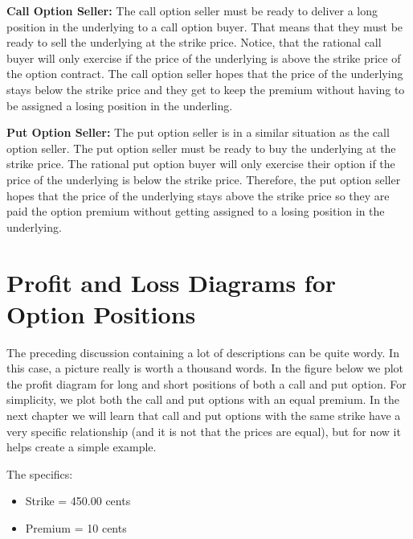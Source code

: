 \documentclass[
]{book}
\begin{document}
\textbf{Call Option Seller:} The call option seller must be ready to deliver a long position in the underlying to a call option buyer. That means that they must be ready to sell the underlying at the strike price. Notice, that the rational call buyer will only exercise if the price of the underlying is above the strike price of the option contract. The call option seller hopes that the price of the underlying stays below the strike price and they get to keep the premium without having to be assigned a losing position in the underling.

\textbf{Put Option Seller:} The put option seller is in a similar situation as the call option seller. The put option seller must be ready to buy the underlying at the strike price. The rational put option buyer will only exercise their option if the price of the underlying is below the strike price. Therefore, the put option seller hopes that the price of the underlying stays above the strike price so they are paid the option premium without getting assigned to a losing position in the underlying.

\hypertarget{profit-and-loss-diagrams-for-option-positions}{%
\section{\texorpdfstring{\textbf{Profit and Loss Diagrams for Option Positions}}{Profit and Loss Diagrams for Option Positions}}\label{profit-and-loss-diagrams-for-option-positions}}

The preceding discussion containing a lot of descriptions can be quite wordy. In this case, a picture really is worth a thousand words. In the figure below we plot the profit diagram for long and short positions of both a call and put option. For simplicity, we plot both the call and put options with an equal premium. In the next chapter we will learn that call and put options with the same strike have a very specific relationship (and it is not that the prices are equal), but for now it helps create a simple example.

The specifics:

\begin{itemize}
\item
  Strike = 450.00 cents
\item
  Premium = 10 cents
\end{itemize}
\end{document}
